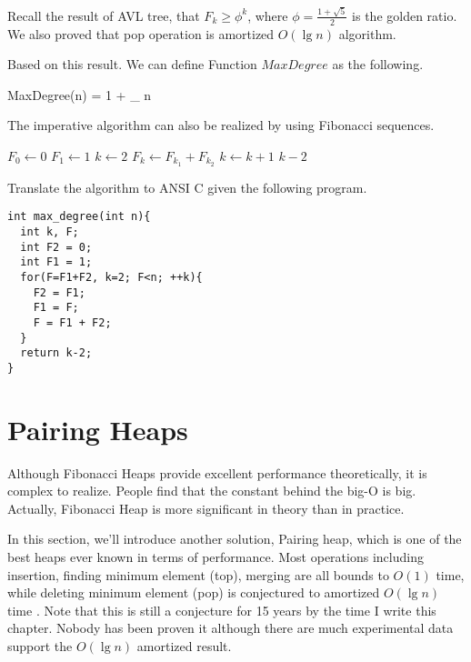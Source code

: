 \documentclass{article}
\begin{document}
Recall the result of AVL tree, that $F_k \geq \phi^k$, where
$\phi = \frac{1+\sqrt{5}}{2}$ is the golden ratio. We also proved
that pop operation is amortized $O(\lg n)$ algorithm.

Based on this result. We can define Function $MaxDegree$ as the following.

\be
  MaxDegree(n) = 1 + \lfloor \log_{\phi} n \rfloor
\ee

The imperative  algorithm can also be realized by
using Fibonacci sequences.

\begin{algorithmic}[1]
  \State $F_0 \gets 0$
  \State $F_1 \gets 1$
  \State $k \gets 2$
  \Repeat
    \State $F_k \gets F_{k_1} + F_{k_2}$
    \State $k \gets k+1$
  \State \Return $k-2$
\EndFunction
\end{algorithmic}

Translate the algorithm to ANSI C given the following program.

\lstset{language=C}
\begin{lstlisting}
int max_degree(int n){
  int k, F;
  int F2 = 0;
  int F1 = 1;
  for(F=F1+F2, k=2; F<n; ++k){
    F2 = F1;
    F1 = F;
    F = F1 + F2;
  }
  return k-2;
}
\end{lstlisting}


\section{Pairing Heaps}
\label{pairing-heap} 
Although Fibonacci Heaps provide excellent performance theoretically,
it is complex to realize. People find that the constant behind the
big-O is big. Actually, Fibonacci Heap is more significant in theory
than in practice.

In this section, we'll introduce another solution, Pairing heap,
which is one of the best heaps ever known in terms of performance.
Most operations including insertion, finding minimum element (top),
merging are all bounds to $O(1)$ time, while deleting minimum element (pop)
is conjectured to amortized $O(\lg n)$ time \cite{pairing-heap}
\cite{okasaki-book}. Note that this is still
a conjecture for 15 years by the time I write this chapter. Nobody has been
proven it although there are much experimental data support the
$O(\lg n)$ amortized result.
\end{document}
